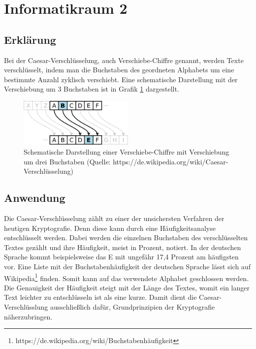 \documentclass[12pt, letterpaper]{article}
\begin{document}
\section{Informatikraum 2}

\subsection{Erklärung}

Bei der Caesar-Verschlüsselung, auch Verschiebe-Chiffre genannt, werden Texte verschlüsselt, indem man die Buchstaben des geordneten Alphabets um eine bestimmte Anzahl zyklisch verschiebt.
Eine schematische Darstellung mit der Verschiebung um 3 Buchstaben ist in Grafik \ref{fig:caesar3} dargestellt.

\begin{figure}[h]
    \centering
    \includegraphics[width=0.5\textwidth]{caesar3}
    \caption{Schematische Darstellung einer Verschiebe-Chiffre mit Verschiebung um drei Buchstaben (Quelle: https://de.wikipedia.org/wiki/Caesar-Verschlüsselung)}
    \label{fig:caesar3}
\end{figure}

\subsection{Anwendung}

Die Caesar-Verschlüsselung zählt zu einer der unsichersten Verfahren der heutigen Kryptografie.
Denn diese kann durch eine Häufigkeitsanalyse entschlüsselt werden.
Dabei werden die einzelnen Buchstaben des verschlüsselten Textes gezählt und ihre Häufigkeit, meist in Prozent, notiert.
In der deutschen Sprache kommt beispielsweise das E mit ungefähr 17,4 Prozent am häufigsten vor.
Eine Liste mit der Buchstabenhäufigkeit der deutschen Sprache lässt sich auf Wikipedia\footnote{https://de.wikipedia.org/wiki/Buchstabenhäufigkeit} finden.
Somit kann auf das verwendete Alphabet geschlossen werden.
Die Genauigkeit der Häufigkeit steigt mit der Länge des Textes, womit ein langer Text leichter zu entschlüsseln ist als eine kurze.
Damit dient die Caesar-Verschlüsslung ausschließlich dafür, Grundprinzipien der Kryptografie näherzubringen.
\end{document}
